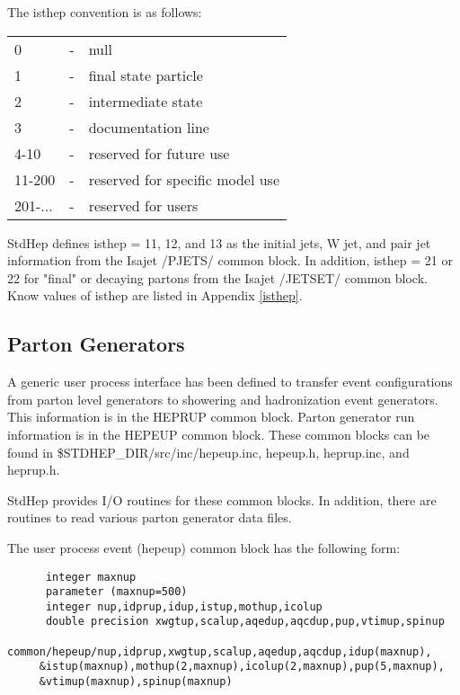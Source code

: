 \noindent The isthep convention is as follows:

\begin{center}
\begin{tabular}{lcl}
 0      &-&null\\
 1      &-&final state particle\\
 2      &-&intermediate state\\
 3      &-&documentation line\\
 4-10   &-&reserved for future use\\
 11-200 &-&reserved for specific model use\\
 201-...&-&reserved for users\\
\end{tabular}
\end{center}

\noindent StdHep defines isthep = 11, 12, and 13 as the initial jets, W jet, 
and pair jet information from the Isajet /PJETS/ common block.  In addition,
isthep = 21 or 22 for "final" or decaying partons from the Isajet /JETSET/ 
common block.  Know values of isthep are listed in Appendix \ref{isthep}.

\subsection { Parton Generators }

A generic user process interface has been defined\cite{leshouches}
to transfer event configurations from parton level generators 
to showering and hadronization event generators.  This information is
in the HEPRUP common block.   
Parton generator run information is in the HEPEUP common block.
These common blocks can be found in \$STDHEP\_DIR/src/inc/hepeup.inc, 
hepeup.h, heprup.inc, and heprup.h.

StdHep provides I/O routines for these common blocks.  
In addition, there are routines to read various parton generator data files.

\noindent The user process event (hepeup) common block has the following form:
\begin{verbatim}
      integer maxnup
      parameter (maxnup=500)
      integer nup,idprup,idup,istup,mothup,icolup
      double precision xwgtup,scalup,aqedup,aqcdup,pup,vtimup,spinup
      common/hepeup/nup,idprup,xwgtup,scalup,aqedup,aqcdup,idup(maxnup),
     &istup(maxnup),mothup(2,maxnup),icolup(2,maxnup),pup(5,maxnup),
     &vtimup(maxnup),spinup(maxnup)
\end{verbatim}

